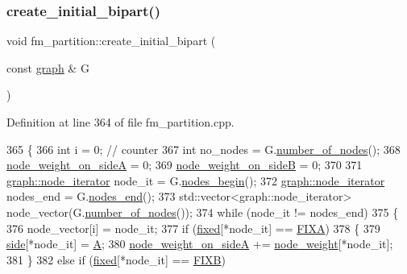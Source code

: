 \subsubsection{\texorpdfstring{create\+\_\+initial\+\_\+bipart()}{create\_initial\_bipart()}}
{\footnotesize\ttfamily void fm\+\_\+partition\+::create\+\_\+initial\+\_\+bipart (\begin{DoxyParamCaption}\item[{const \mbox{\hyperlink{classgraph}{graph}} \&}]{G }\end{DoxyParamCaption})\hspace{0.3cm}{\ttfamily [protected]}}



Definition at line 364 of file fm\+\_\+partition.\+cpp.


\begin{DoxyCode}
365 \{
366     \textcolor{keywordtype}{int} i = 0;  \textcolor{comment}{// counter}
367     \textcolor{keywordtype}{int} no\_nodes = G.\mbox{\hyperlink{classgraph_a42c78e0a9f115655e3ff0efe35ebfc4e}{number\_of\_nodes}}();
368     \mbox{\hyperlink{classfm__partition_a8a50d15b399c9ed35d6987c8fb68aa2b}{node\_weight\_on\_sideA}} = 0;
369     \mbox{\hyperlink{classfm__partition_a6dc967e385b31096a85f17c51f1f0824}{node\_weight\_on\_sideB}} = 0;
370 
371     \mbox{\hyperlink{classgraph_a2cb374b84c133ce13f94e73c3e5da7fa}{graph::node\_iterator}} node\_it = G.\mbox{\hyperlink{classgraph_aec053a4b509d1be804237a80044c54c0}{nodes\_begin}}();
372     \mbox{\hyperlink{classgraph_a2cb374b84c133ce13f94e73c3e5da7fa}{graph::node\_iterator}} nodes\_end = G.\mbox{\hyperlink{classgraph_abbf9c0cb5629e98e1142254911238173}{nodes\_end}}();
373     std::vector<graph::node\_iterator> node\_vector(G.\mbox{\hyperlink{classgraph_a42c78e0a9f115655e3ff0efe35ebfc4e}{number\_of\_nodes}}());
374     \textcolor{keywordflow}{while} (node\_it != nodes\_end)
375     \{
376     node\_vector[i] = node\_it;
377     \textcolor{keywordflow}{if} (\mbox{\hyperlink{classfm__partition_a3b04658dbb5b27ddd20194ff74a71082}{fixed}}[*node\_it] == \mbox{\hyperlink{classfm__partition_a468a80e072d3ff18e5da33005825bcb1}{FIXA}})
378     \{
379         \mbox{\hyperlink{classfm__partition_af83309e781e9658fc0ff923ced087bfc}{side}}[*node\_it] = \mbox{\hyperlink{classfm__partition_a738e75c601403754e61e6dac623fd3ab}{A}};
380         \mbox{\hyperlink{classfm__partition_a8a50d15b399c9ed35d6987c8fb68aa2b}{node\_weight\_on\_sideA}} += \mbox{\hyperlink{classfm__partition_ae1ba643b4bd6721075ab7b608bcf3cd6}{node\_weight}}[*node\_it];
381     \}
382     \textcolor{keywordflow}{else} \textcolor{keywordflow}{if} (\mbox{\hyperlink{classfm__partition_a3b04658dbb5b27ddd20194ff74a71082}{fixed}}[*node\_it] == \mbox{\hyperlink{classfm__partition_a0b9a66f0e8093ee83482f93d6aa5b2eb}{FIXB}})

\end{DoxyCode}
